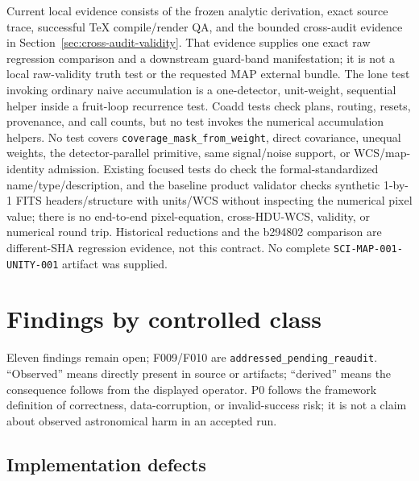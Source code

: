 \documentclass[11pt]{article}
\newcommand{\code}[1]{\nolinkurl{#1}}
\begin{document}
Current local evidence consists of the frozen analytic derivation, exact source
trace, successful TeX compile/render QA, and the bounded cross-audit evidence in
Section~\ref{sec:cross-audit-validity}.  That evidence supplies one exact raw
regression comparison and a downstream guard-band manifestation; it is not a
local raw-validity truth test or the requested MAP external bundle.  The lone
test invoking ordinary
naive accumulation is a one-detector, unit-weight, sequential helper inside a
fruit-loop recurrence test.  Coadd tests check plans, routing, resets,
provenance, and call counts, but no test invokes the numerical accumulation
helpers.  No test covers \code{coverage_mask_from_weight}, direct covariance,
unequal weights, the detector-parallel primitive, same signal/noise support, or
WCS/map-identity admission.  Existing focused tests do check the
formal-standardized name/type/description, and the baseline product validator
checks synthetic 1-by-1 FITS headers/structure with units/WCS without inspecting
the numerical pixel value;
there is no end-to-end pixel-equation, cross-HDU-WCS, validity, or numerical
round trip.  Historical reductions and the b294802 comparison are different-SHA
regression evidence, not this contract.  No complete
\code{SCI-MAP-001-UNITY-001} artifact was supplied.

\section{Findings by controlled class}

Eleven findings remain open; F009/F010 are
\code{addressed_pending_reaudit}.  ``Observed'' means directly present in source or
artifacts; ``derived'' means the consequence follows from the displayed
operator.  P0 follows the framework definition of correctness,
data-corruption, or invalid-success risk; it is not a claim about observed
astronomical harm in an accepted run.

\subsection{Implementation defects}
\end{document}
